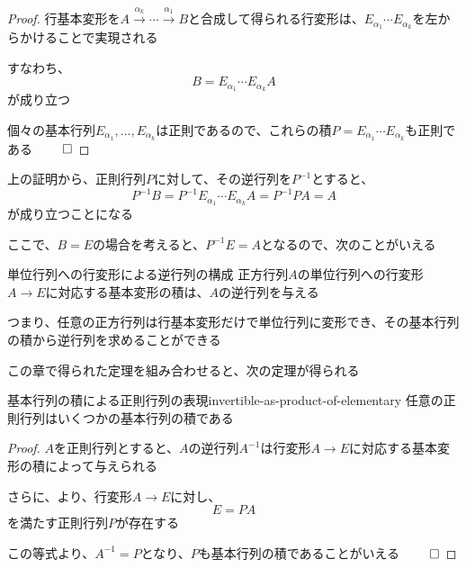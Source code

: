 \documentclass[../../../topic_linear-algebra]{subfiles}
\begin{document}
\begin{proof}
  行基本変形を$A \xrightarrow{\alpha_k} \cdots \xrightarrow{\alpha_1} B$と合成して得られる行変形は、$E_{\alpha_1} \cdots E_{\alpha_k}$を左からかけることで実現される

  すなわち、
  \begin{equation*}
    B = E_{\alpha_1} \cdots E_{\alpha_k} A
  \end{equation*}
  が成り立つ

  個々の基本行列$E_{\alpha_1},\ldots,E_{\alpha_k}$は正則であるので、これらの積$P = E_{\alpha_1} \cdots E_{\alpha_k}$も正則である $\qed$
\end{proof}

\br

上の証明から、正則行列$P$に対して、その逆行列を$P^{-1}$とすると、
\begin{equation*}
  P^{-1}B = P^{-1}E_{\alpha_1} \cdots E_{\alpha_k} A = P^{-1}PA = A
\end{equation*}
が成り立つことになる

\br

ここで、$B = E$の場合を考えると、$P^{-1}E = A$となるので、次のことがいえる

\begin{theorem*}{単位行列への行変形による逆行列の構成}
  正方行列$A$の単位行列への行変形$A \to E$に対応する基本変形の積は、$A$の逆行列を与える
\end{theorem*}

つまり、任意の正方行列は行基本変形だけで単位行列に変形でき、その基本行列の積から逆行列を求めることができる

\sectionline

この章で得られた定理を組み合わせると、次の定理が得られる

\begin{theorem}{基本行列の積による正則行列の表現}{invertible-as-product-of-elementary}
  任意の正則行列はいくつかの基本行列の積である
\end{theorem}

\begin{proof}
  $A$を正則行列とすると、$A$の逆行列$A^{-1}$は行変形$A \to E$に対応する基本変形の積によって与えられる

  さらに、より、行変形$A \to E$に対し、
  \begin{equation*}
    E = PA
  \end{equation*}
  を満たす正則行列$P$が存在する

  この等式より、$A^{-1} = P$となり、$P$も基本行列の積であることがいえる $\qed$
\end{proof}
\end{document}
